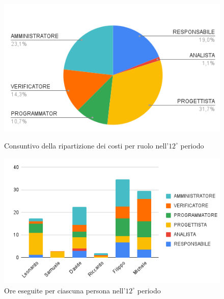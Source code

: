 \begin{figure}[H]
    \centering
    \includegraphics[width=0.6\linewidth]{grafici/12_periodo_torta_consuntivo.png}
    \caption{Consuntivo della ripartizione dei costi per ruolo nell'$12^\circ$ periodo}
        \vspace{5mm}
    \includegraphics[width=0.7\linewidth]{grafici/12_periodo_istogramma_consuntivo.png}
    \caption{Ore eseguite per ciascuna persona nell'$12^\circ$ periodo}
\end{figure}
